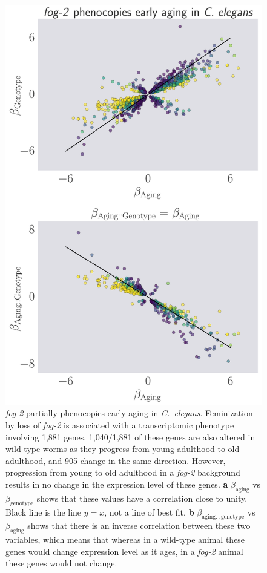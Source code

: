 \documentclass[9pt,twocolumn,twoside]{gsag3jnl}
\newcommand{\cel}{\emph{C.~elegans}}
\newcommand{\fog}{\emph{fog-2}}
\newcommand{\fogn}{1,881}
\newcommand{\coexpressed}{905}
\newcommand{\intersectn}{1,040}
\begin{document}
\begin{figure}[htbp]
\renewcommand{\familydefault}{\sfdefault}\normalfont{}
\centering
\includegraphics[width=\linewidth]{../output/figs/final_figs/aberrant_aging.pdf}
\caption{ \fog{} partially phenocopies early aging in \cel{}. Feminization by loss of \fog{} is associated with a transcriptomic phenotype involving \fogn{} genes. \intersectn{}/\fogn{} of these genes are also altered in wild-type worms as they progress from young adulthood to old adulthood, and \coexpressed{} change in the same direction. However, progression from young to old adulthood in a \fog{} background results in no change in the expression level of these genes. \textbf{a} $\beta_\mathrm{aging}$ vs $\beta_\mathrm{genotype}$ shows that these values have a correlation close to unity. Black line is the line $y=x$, not a line of best fit. \textbf{b} $\beta_\mathrm{aging::genotype}$ vs $\beta_\mathrm{aging}$ shows that there is an inverse correlation between these two variables, which means that whereas in a wild-type animal these genes would change expression level as it ages, in a \fog{} animal these genes would not change.
}
\end{figure}
\end{document}
